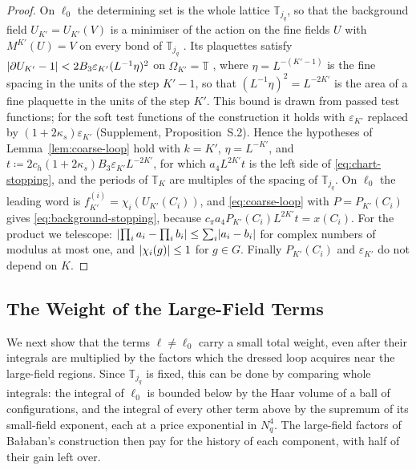 \documentclass[11pt]{preprint}
\DeclarePairedDelimiter{\abs}{\lvert}{\rvert}
\numberwithin{equation}{section}
\theoremstyle{definition}
\theoremstyle{remark}
\theoremstyle{plain}
\begin{document}
\begin{proof}
On $\ell_0$ the determining set is the whole lattice $\mathbb T_{j_q}$, so that the background field $U_{K'} = U_{K'}(V)$ is a minimiser of the action on the fine fields $U$ with $M^{K'}(U) = V$ on every bond of $\mathbb T_{j_q}$ \cite[(2.11), (2.12), p.~256]{BalabanCRE}. Its plaquettes satisfy $\abs{\partial U_{K'} - 1} < 2B_3\varepsilon_{K'}(L^{-1}\eta)^2$ on $\Omega_{K'} = \mathbb T$ \cite[p.~268]{BalabanCRE}, where $\eta = L^{-(K'-1)}$ is the fine spacing in the units of the step $K' - 1$, so that $(L^{-1}\eta)^2 = L^{-2K'}$ is the area of a fine plaquette in the units of the step $K'$. This bound is drawn from passed test functions; for the soft test functions of the construction it holds with $\varepsilon_{K'}$ replaced by $(1 + 2\kappa_s)\varepsilon_{K'}$ (Supplement, Proposition~S.2). Hence the hypotheses of Lemma~\ref{lem:coarse-loop} hold with $k = K'$, $\eta = L^{-K'}$, and $t \coloneqq 2c_h(1 + 2\kappa_s)B_3\varepsilon_{K'}L^{-2K'}$, for which $a_4L^{2K'}t$ is the left side of \eqref{eq:chart-stopping}, and the periods of $\mathbb T_K$ are multiples of the spacing of $\mathbb T_{j_q}$. On $\ell_0$ the leading word is $f^{(i)}_{K'} = \chi_i(U_{K'}(C_i))$, and \eqref{eq:coarse-loop} with $P = P_{K'}(C_i)$ gives \eqref{eq:background-stopping}, because $c_\pi a_4P_{K'}(C_i)L^{2K'}t = x(C_i)$. For the product we telescope: $\abs{\prod_ia_i - \prod_ib_i} \leq \sum_i\abs{a_i - b_i}$ for complex numbers of modulus at most one, and $\abs{\chi_i(g)} \leq 1$ for $g \in G$. Finally $P_{K'}(C_i)$ and $\varepsilon_{K'}$ do not depend on $K$.
\end{proof}

\subsection{The Weight of the Large-Field Terms}\label{sec:large-field-weight}

We next show that the terms $\ell \neq \ell_0$ carry a small total weight, even after their integrals are multiplied by the factors which the dressed loop acquires near the large-field regions. Since $\mathbb T_{j_q}$ is fixed, this can be done by comparing whole integrals: the integral of $\ell_0$ is bounded below by the Haar volume of a ball of configurations, and the integral of every other term above by the supremum of its small-field exponent, each at a price exponential in $N_q^4$. The large-field factors of Ba{\l}aban's construction then pay for the history of each component, with half of their gain left over.
\end{document}
